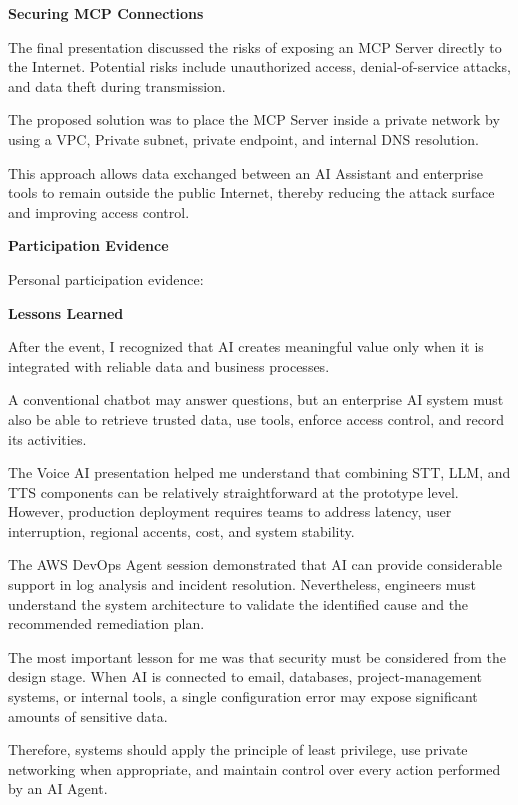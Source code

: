 \vspace{0.5em}\noindent\textbf{Securing MCP Connections}\par

The final presentation discussed the risks of exposing an MCP Server
directly to the Internet. Potential risks include unauthorized access,
denial-of-service attacks, and data theft during transmission.

The proposed solution was to place the MCP Server inside a private
network by using a VPC, Private subnet, private endpoint, and internal
DNS resolution.

This approach allows data exchanged between an AI Assistant and
enterprise tools to remain outside the public Internet, thereby reducing
the attack surface and improving access control.

\vspace{0.5em}\noindent\textbf{Participation Evidence}\par

Personal participation evidence:

\vspace{0.5em}\noindent\textbf{Lessons Learned}\par

After the event, I recognized that AI creates meaningful value only when
it is integrated with reliable data and business processes.

A conventional chatbot may answer questions, but an enterprise AI system
must also be able to retrieve trusted data, use tools, enforce access
control, and record its activities.

The Voice AI presentation helped me understand that combining STT, LLM,
and TTS components can be relatively straightforward at the prototype
level. However, production deployment requires teams to address latency,
user interruption, regional accents, cost, and system stability.

The AWS DevOps Agent session demonstrated that AI can provide
considerable support in log analysis and incident resolution.
Nevertheless, engineers must understand the system architecture to
validate the identified cause and the recommended remediation plan.

The most important lesson for me was that security must be considered
from the design stage. When AI is connected to email, databases,
project-management systems, or internal tools, a single configuration
error may expose significant amounts of sensitive data.

Therefore, systems should apply the principle of least privilege, use
private networking when appropriate, and maintain control over every
action performed by an AI Agent.

